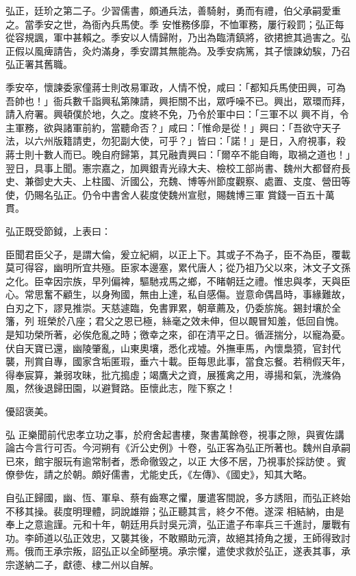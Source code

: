 \begin{pinyinscope}
 弘正，廷玠之第二子。少習儒書，頗通兵法，善騎射，勇而有禮，伯父承嗣愛重之。當季安之世，為衙內兵馬使。季
 安惟務侈靡，不恤軍務，屢行殺罰；弘正每從容規諷，軍中甚賴之。季安以人情歸附，乃出為臨清鎮將，欲捃摭其過害之。弘正假以風痺請告，灸灼滿身，季安謂其無能為。及季安病篤，其子懷諫幼騃，乃召弘正署其舊職。



 季安卒，懷諫委家僮蔣士則改易軍政，人情不悅，咸曰：「都知兵馬使田興，可為吾帥也！」衙兵數千詣興私第陳請，興拒關不出，眾呼噪不已。興出，眾環而拜，請入府署。興頓僕於地，久之。度終不免，乃令於軍中曰：「三軍不以
 興不肖，令主軍務，欲與諸軍前約，當聽命否？」咸曰：「惟命是從！」興曰：「吾欲守天子法，以六州版籍請吏，勿犯副大使，可乎？」皆曰：「諾！」是日，入府視事，殺蔣士則十數人而已。晚自府歸第，其兄融責興曰：「爾卒不能自晦，取禍之道也！」翌日，具事上聞。憲宗嘉之，加興銀青光祿大夫、檢校工部尚書、魏州大都督府長史、兼御史大夫、上柱國、沂國公，充魏、博等州節度觀察、處置、支度、營田等使，仍賜名弘正。仍令中書舍人裴度使魏州宣慰，賜魏博三軍
 賞錢一百五十萬貫。



 弘正既受節鉞，上表曰：



 臣聞君臣父子，是謂大倫，爰立紀綱，以正上下。其或子不為子，臣不為臣，覆載莫可得容，幽明所宜共殛。臣家本邊塞，累代唐人；從乃祖乃父以來，沐文子文孫之化。臣幸因宗族，早列偏裨，驅馳戎馬之鄉，不睹朝廷之禮。惟忠與孝，天與臣心。常思奮不顧生，以身殉國，無由上達，私自感傷。豈意命偶昌時，事緣難故，白刃之下，謬見推崇。天慈遽臨，免書罪累，朝章薦及，仍委旂旄。錫封壤於全籓，列
 班榮於八座；君父之恩已極，絲毫之效未伸，但以靦冒知羞，低回自愧。是知功榮所著，必俟危亂之時；徼幸之來，卻在清平之日。循涯揣分，以寵為憂。伏自天寶已還，幽陵肇亂，山東奧壤，悉化戎墟。外撫車馬，內懷梟獍，官封代襲，刑賞自專，國家含垢匿瑕，垂六十載。臣每思此事，當食忘餐。若稍假天年，得奉宸算，兼弱攻昧，批亢搗虛；竭鷹犬之資，展獲禽之用，導揚和氣，洗滌偽風，然後退歸田園，以避賢路。臣懷此志，陛下察之！



 優詔褒美。



 弘
 正樂聞前代忠孝立功之事，於府舍起書樓，聚書萬餘卷，視事之隙，與賓佐講論古今言行可否。今河朔有《沂公史例》十卷，弘正客為弘正所著也。魏州自承嗣已來，館宇服玩有逾常制者，悉命徹毀之，以正大侈不居，乃視事於採訪使。賓僚參佐，請之於朝。頗好儒書，尤能史氏，《左傳》、《國史》，知其大略。



 自弘正歸國，幽、恆、軍阜、蔡有齒寒之懼，屢遣客間說，多方誘阻，而弘正終始不移其操。裴度明理體，詞說雄辯；弘正聽其言，終夕不倦。遂深
 相結納，由是奉上之意逾謹。元和十年，朝廷用兵討吳元濟，弘正遣子布率兵三千進討，屢戰有功。李師道以弘正效忠，又襲其後，不敢顯助元濟，故絕其掎角之援，王師得致討焉。俄而王承宗叛，詔弘正以全師壓境。承宗懼，遣使求救於弘正，遂表其事，承宗遂納二子，獻德、棣二州以自解。




\end{pinyinscope}
